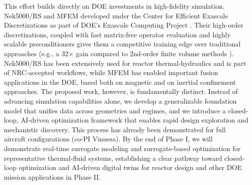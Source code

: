 This effort builds directly on DOE investments in high-fidelity simulation.
Nek5000/RS and MFEM developed under the Center for Efficient Exascale
Discretizations as part of DOE's Exascale Computing Project \cite{ceed}.  
Their high-order
discretizations, coupled with fast matrix-free operator evaluation and highly
scalable preconditioners gives them a competitive training edge over
traditional approaches (e.g., a 32$\times$ gain compared to 2nd-order finite volume
methods \cite{Min2024Wind,Tomboulides2024ABL}).  Nek5000/RS has been
extensively used for reactor thermal-hydraulics and is part of NRC-accepted
workflows, while MFEM has enabled important fusion applications in the DOE,
based both on magnetic and on inertial confinement approaches.
The proposed work, however, is fundamentally distinct.
Instead of advancing simulation capabilities alone, we develop a generalizable
foundation model that unifies data across geometries and regimes, and we
introduce a closed-loop, AI-driven optimization framework that enables rapid
design exploration and mechanistic discovery.   This process has already
been demonstrated for full aircraft configurations (co-PI Vinuesa).
By the end of Phase I, we will
demonstrate real-time surrogate modeling and surrogate-based optimization for
representative thermal-fluid systems, establishing a clear pathway toward
closed-loop optimization and AI-driven digital twins for reactor design 
and other DOE mission applications in Phase II.



